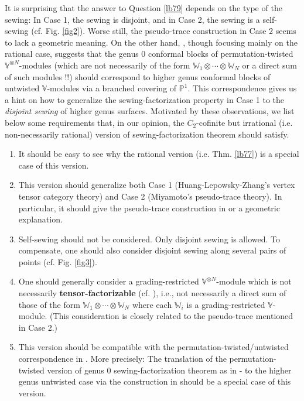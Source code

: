 \documentclass[11pt,b5paper,notitlepage]{article}
\theoremstyle{definition}
\theoremstyle{plain}
\newcommand{\Vbb}{\mathbb V}
\newcommand{\Wbb}{\mathbb W}
\newcommand{\Pbb}{\mathbb P}
\newcommand{\<}{\left\langle}
\renewcommand{\>}{\right\rangle}
\numberwithin{equation}{section}
\begin{document}
It is surprising that the answer to Question \ref{lb79} depends on the type of the sewing: In Case 1, the sewing is disjoint, and in Case 2, the sewing is a self-sewing (cf. Fig. \ref{fig2}). Worse still, the pseudo-trace construction in Case 2 seems to lack a geometric meaning. On the other hand, \cite{Gui-permutation}, though focusing mainly on the rational case, suggests that the genus $0$ conformal blocks of permutation-twisted $\Vbb^{\otimes N}$-modules (which are not necessarily of the form $\Wbb_1\otimes\cdots\otimes\Wbb_N$ or a direct sum of such modules !!) should correspond to higher genus conformal blocks of untwisted $\Vbb$-modules via a branched covering of $\Pbb^1$. This correspondence gives us a hint on how to generalize the sewing-factorization property in Case 1 to the \emph{disjoint sewing} of higher genus surfaces. Motivated by these observations, we list below some requirements that, in our opinion, the $C_2$-cofinite but irrational (i.e. non-necessarily rational) version of sewing-factorization theorem should satisfy.
\begin{enumerate}[align=left, label=R\arabic*.]
\item It should be easy to see why the rational version (i.e. Thm. \ref{lb77}) is a special case of this version.
\item This version should generalize both Case 1 (Huang-Lepowsky-Zhang's vertex tensor category theory) and Case 2 (Miyamoto's pseudo-trace theory). In particular, it should give the pseudo-trace construction in \cite{Miy-modular-invariance} or \cite{AN-pseudo-trace} a geometric explanation.
\item Self-sewing should not be considered. Only disjoint sewing is allowed. To compensate, one should also consider disjoint sewing along several pairs of points (cf. Fig. \ref{fig3}).
\item One should generally consider a grading-restricted $\Vbb^{\otimes N}$-module which is not necessarily \textbf{tensor-factorizable} (cf. \cite{Gui-permutation}), i.e., not necessarily a direct sum of those of the form $\Wbb_1\otimes\cdots\otimes\Wbb_N$ where each $\Wbb_i$ is a grading-restricted $\Vbb$-module. (This consideration is closely related to the pseudo-trace mentioned in Case 2.)
\item This version should be compatible with the permutation-twisted/untwisted correspondence in \cite{Gui-permutation}. More precisely: The translation of the permutation-twisted version of genus $0$ sewing-factorization theorem as in \cite{HLZ1,HLZ2}-\cite{HLZ8} to the higher genus untwisted case via the construction in \cite{Gui-permutation} should be a special case of this version.
\end{enumerate}
\end{document}
